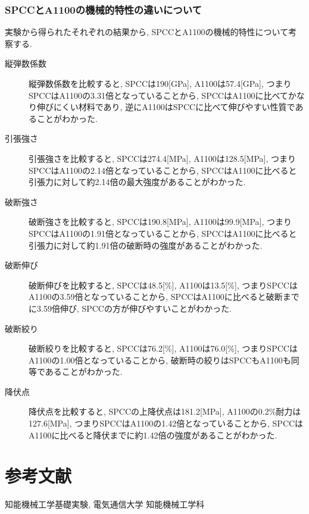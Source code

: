 \documentclass[a4paper,11pt,uplatex]{jsarticle}
\begin{document}
\subsubsection{SPCCとA1100の機械的特性の違いについて}
実験から得られたそれぞれの結果から, SPCCとA1100の機械的特性について考察する.
\begin{description}
  \item[縦弾数係数]
  縦弾数係数を比較すると, SPCCは190[GPa], A1100は57.4[GPa], つまりSPCCはA1100の3.31倍となっていることから, SPCCはA1100に比べてかなり伸びにくい材料であり, 逆にA1100はSPCCに比べて伸びやすい性質であることがわかった.
  \item[引張強さ]
  引張強さを比較すると, SPCCは274.4[MPa], A1100は128.5[MPa], つまりSPCCはA1100の2.14倍となっていることから, SPCCはA1100に比べると引張力に対して約2.14倍の最大強度があることがわかった.
  \item[破断強さ]
  破断強さを比較すると, SPCCは190.8[MPa], A1100は99.9[MPa], つまりSPCCはA1100の1.91倍となっていることから, SPCCはA1100に比べると引張力に対して約1.91倍の破断時の強度があることがわかった.
  \item[破断伸び]
  破断伸びを比較すると, SPCCは48.5[\%], A1100は13.5[\%], つまりSPCCはA1100の3.59倍となっていることから, SPCCはA1100に比べると破断までに3.59倍伸び, SPCCの方が伸びやすいことがわかった.
  \item[破断絞り]
  破断絞りを比較すると, SPCCは76.2[\%], A1100は76.0[\%], つまりSPCCはA1100の1.00倍となっていることから, 破断時の絞りはSPCCもA1100も同等であることがわかった.
  \item[降伏点]
  降伏点を比較すると, SPCCの上降伏点は181.2[MPa], A1100の0.2\%耐力は127.6[MPa], つまりSPCCはA1100の1.42倍となっていることから, SPCCはA1100に比べると降伏までに約1.42倍の強度があることがわかった.
\end{description}

\section{参考文献}
\begin{thebibliography}{9}
   知能機械工学基礎実験, 電気通信大学  知能機械工学科
\end{thebibliography}
\end{document}
